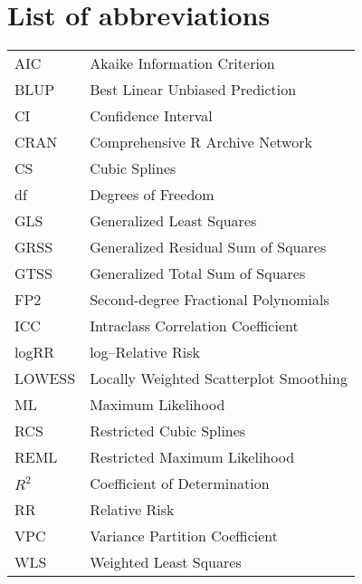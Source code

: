 %

\chapter*{List of abbreviations}
\begin{tabular}{ll}

AIC & Akaike Information Criterion \\
BLUP & Best Linear Unbiased Prediction \\
CI & Confidence Interval \\
CRAN & Comprehensive R Archive Network \\
CS & Cubic Splines \\
df & Degrees of Freedom \\
GLS & Generalized Least Squares \\
GRSS & Generalized Residual Sum of Squares \\
GTSS & Generalized Total Sum of Squares \\
FP2 & Second-degree Fractional Polynomials \\
ICC & Intraclass Correlation Coefficient \\
logRR & log--Relative Risk \\
LOWESS & Locally Weighted Scatterplot Smoothing \\
ML & Maximum Likelihood \\
RCS & Restricted Cubic Splines \\
REML & Restricted Maximum Likelihood \\
$R^2$ & Coefficient of Determination \\
RR & Relative Risk \\
VPC & Variance Partition Coefficient \\
WLS & Weighted Least Squares


\end{tabular}